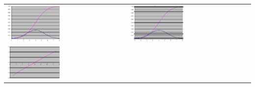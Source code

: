 \documentclass[
  10pt,
  ignorenonframetext,
]{beamer}
\begin{document}
\begin{frame}{}
\protect\hypertarget{section-42}{}
\begin{longtable}[]{@{}
  >{\raggedright\arraybackslash}p{}
  >{\raggedleft\arraybackslash}p{}@{}}
\toprule()
\endhead
\includegraphics[width=0.45\textwidth,height=\textheight]{figuras/Papel3.png}
&
\includegraphics[width=0.45\textwidth,height=\textheight]{figuras/Papel4.png} \\
\includegraphics[width=0.45\textwidth,height=\textheight]{figuras/Papel5.png}
& \\
\bottomrule()
\end{longtable}
\end{frame}
\end{document}
